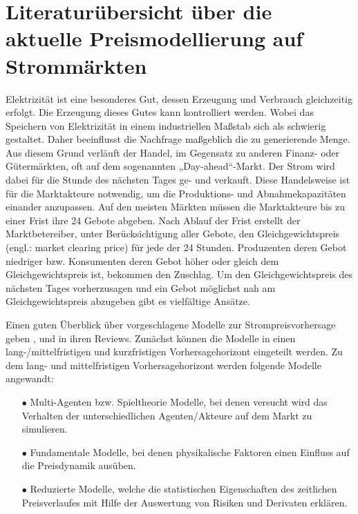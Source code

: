 

\section{Literaturübersicht über die aktuelle Preismodellierung auf Strommärkten}



Elektrizität ist eine besonderes Gut, dessen Erzeugung und Verbrauch gleichzeitig erfolgt. Die Erzeugung dieses Gutes kann kontrolliert werden. Wobei das Speichern von Elektrizität in einem industriellen Maßstab sich als schwierig gestaltet. Daher beeinflusst die Nachfrage maßgeblich die zu generierende Menge. Aus diesem Grund verläuft der Handel, im Gegensatz zu anderen Finanz- oder Gütermärkten, oft auf dem sogenannten „Day-ahead“-Markt. Der Strom wird dabei für die Stunde des nächsten Tages ge- und verkauft. Diese Handelsweise ist für die Marktakteure notwendig, um die Produktions- und Abnahmekapazitäten einander anzupassen. Auf den meisten Märkten müssen die Marktakteure bis zu einer Frist ihre 24 Gebote abgeben. Nach Ablauf der Frist erstellt der Marktbetereiber, unter Berücksichtigung aller Gebote, den Gleichgewichtspreis (engl.: market clearing price) für jede der 24 Stunden. Produzenten deren Gebot niedriger bzw. Konsumenten deren Gebot höher oder gleich dem Gleichgewichtspreis ist, bekommen den Zuschlag. Um den Gleichgewichtspreis des nächsten Tages vorherzusagen und ein Gebot möglichst nah am Gleichgewichtspreis abzugeben gibt es vielfältige Ansätze.

Einen guten Überblick über vorgeschlagene Modelle zur Strompreisvorhersage geben \citet{Aggarwal2009}, \citet{Cerjan2013} und \citet{Weron2014} in ihren Reviews. Zunächst können die Modelle in einen lang-/mittelfristigen und kurzfristigen Vorhersagehorizont eingeteilt werden. Zu dem lang- und mittelfristigen Vorhersagehorizont werden folgende Modelle angewandt:
\begin{itemize}
\item[\textbf{$\bullet$}]%
Multi-Agenten bzw. Spieltheorie Modelle, bei denen versucht wird das Verhalten der unterschiedlichen Agenten/Akteure auf dem Markt zu simulieren.

\item[\textbf{$\bullet$}]%
Fundamentale Modelle, bei denen physikalische Faktoren einen Einfluss auf die Preisdynamik ausüben.

\item[\textbf{$\bullet$}]%
Reduzierte Modelle, welche die statistischen Eigenschaften des zeitlichen Preisverlaufes mit Hilfe der Auswertung von Risiken und Derivaten erklären.
\end{itemize}


